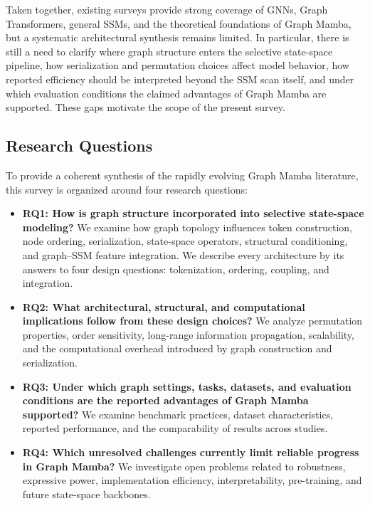 \documentclass[acmsmall]{acmart}
\begin{document}
Taken together, existing surveys provide strong coverage of GNNs, Graph
Transformers, general SSMs, and the theoretical foundations of Graph Mamba,
but a systematic architectural synthesis remains limited. In particular,
there is still a need to clarify where graph structure enters the selective
state-space pipeline, how serialization and permutation choices affect model
behavior, how reported efficiency should be interpreted beyond the SSM scan
itself, and under which evaluation conditions the claimed advantages of Graph
Mamba are supported. These gaps motivate the scope of the present survey.

\subsection{Research Questions}

To provide a coherent synthesis of the rapidly evolving Graph Mamba
literature, this survey is organized around four research questions:

\begin{itemize}

    \item \textbf{RQ1: How is graph structure incorporated into selective
    state-space modeling?}
    We examine how graph topology influences token construction, node ordering,
    serialization, state-space operators, structural conditioning, and
    graph--SSM feature integration.
    We describe every architecture by its answers to four design questions: tokenization, ordering, coupling, and integration.

    \item \textbf{RQ2: What architectural, structural, and computational
    implications follow from these design choices?}
    We analyze permutation properties, order sensitivity, long-range
    information propagation, scalability, and the computational overhead
    introduced by graph construction and serialization.

    \item \textbf{RQ3: Under which graph settings, tasks, datasets, and
    evaluation conditions are the reported advantages of Graph Mamba
    supported?}
    We examine benchmark practices, dataset characteristics, reported
    performance, and the comparability of results across studies.

    \item \textbf{RQ4: Which unresolved challenges currently limit reliable
    progress in Graph Mamba?}
    We investigate open problems related to robustness, expressive power,
    implementation efficiency, interpretability, pre-training, and future
    state-space backbones.

\end{itemize}
\end{document}
